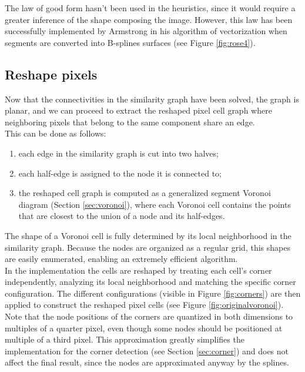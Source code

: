 \documentclass[]{usiinfbachelorproject}
\begin{document}
The law of good form hasn't been used in the heuristics, since it would require a greater inference of the shape composing the image. However, this law has been successfully implemented by Armstrong in his algorithm of vectorization \cite{Armstrong2006} when segments are converted into B-splines surfaces (see Figure \ref{fig:rose4}). 


\subsection{Reshape pixels} \label{sec:reshape}

Now that the connectivities in the similarity graph have been solved, the graph is planar, and we can proceed to extract the reshaped pixel cell graph where neighboring pixels that belong to the same component share an edge. \\
This can be done as follows:
\begin{enumerate}
	\item each edge in the similarity graph is cut into two halves;
	\item each half-edge is assigned to the node it is connected to;
	\item the reshaped cell graph is computed as a generalized segment Voronoi diagram (Section \ref{sec:voronoi}), where each Voronoi cell contains the points that are closest to the union of a node and its half-edges.
\end{enumerate}
The shape of a Voronoi cell is fully determined by its local neighborhood in the similarity graph. Because the nodes are organized as a regular grid, this shapes are easily enumerated, enabling an extremely efficient algorithm.\\
In the implementation the cells are reshaped by treating each cell's corner independently, analyzing its local neighborhood and matching the specific corner configuration. The different configurations (visible in Figure \ref{fig:corners}) are then applied to construct the reshaped pixel cells (see Figure \ref{fig:originalvoronoi}). Note that the node positions of the corners are quantized in both dimensions to multiples of a quarter pixel, even though some nodes should be positioned at multiple of a third pixel. This approximation greatly simplifies the implementation for the corner detection (see Section \ref{sec:corner}) and does not affect the final result, since the nodes are approximated anyway by the splines.
\end{document}
